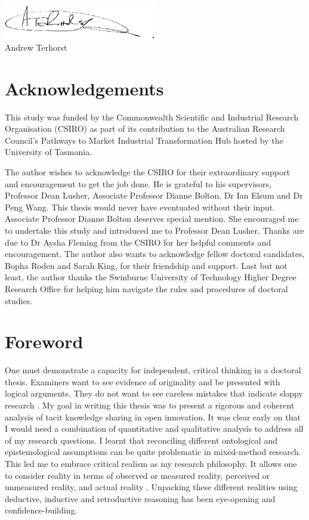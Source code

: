 \documentclass[12pt,table]{book}
\renewcommand{\today}{\the\day \ \monthname \ \the\year}
\begin{document}
\includegraphics[width = 0.5\textwidth]{Images/Signature.png}\\
Andrew Terhorst\\
\shortdate{\today}

\chapter*{Acknowledgements}

This study was funded by the Commonwealth Scientific and Industrial Research Organisation (CSIRO) as part of its contribution to the Australian Research Council's Pathways to Market Industrial Transformation Hub hosted by the University of Tasmania. \medskip

\noindent
The author wishes to acknowledge the CSIRO for their extraordinary support and encouragement to get the job done. He is grateful to his supervisors, Professor Dean Lusher, Associate Professor Dianne Bolton, Dr Ian Elsum and Dr Peng Wang. This thesis would never have eventuated without their input. Associate Professor Dianne Bolton deserves special mention. She encouraged me to undertake this study and introduced me to Professor Dean Lusher. Thanks are due to Dr Aysha Fleming from the CSIRO for her helpful comments and encouragement. The author also wants to acknowledge fellow doctoral candidates, Bopha Roden and Sarah King, for their friendship and support. Last but not least, the author thanks the Swinburne University of Technology Higher Degree Research Office for helping him navigate the rules and procedures of doctoral studies. \medskip

\chapter*{Foreword}

One must demonstrate a capacity for independent, critical thinking in a doctoral thesis. Examiners want to see evidence of originality and be presented with logical arguments. They do not want to see careless mistakes that indicate sloppy research \citep{mullins2002its}. My goal in writing this thesis was to present a rigorous and coherent analysis of tacit knowledge sharing in open innovation. It was clear early on that I would need a combination of quantitative and qualitative analysis to address all of my research questions. I learnt that reconciling different ontological and epistemological assumptions can be quite problematic in mixed-method research. This led me to embrace critical realism as my research philosophy. It allows one to consider reality in terms of observed or  measured reality, perceived or unmeasured reality, and actual reality \citep{bhaskar2013realist}. Unpacking these different realities using deductive, inductive and retroductive reasoning has been eye-opening and confidence-building. \medskip
\end{document}
